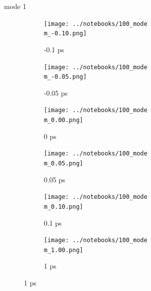 \documentclass{beamer}
\begin{document}
\renewcommand\m{1}
\begin{frame}{mode \m}
	\begin{figure}
		\centering
		\begin{subfigure}[b]{\w\textwidth}
			\centering
			\texttt{[image: ../notebooks/100\_mode\\m\_-0.10.png]}
			\caption{-0.1 ps}
		\end{subfigure}
		\begin{subfigure}[b]{\w\textwidth}
			\centering
			\texttt{[image: ../notebooks/100\_mode\\m\_-0.05.png]}
			\caption{-0.05 ps}
		\end{subfigure}
		\begin{subfigure}[b]{\w\textwidth}
			\centering
			\texttt{[image: ../notebooks/100\_mode\\m\_0.00.png]}
			\caption{0 ps}
		\end{subfigure}
		\begin{subfigure}[b]{\w\textwidth}
			\centering
			\texttt{[image: ../notebooks/100\_mode\\m\_0.05.png]}
			\caption{0.05 ps}
		\end{subfigure}
		\begin{subfigure}[b]{\w\textwidth}
			\centering
			\texttt{[image: ../notebooks/100\_mode\\m\_0.10.png]}
			\caption{0.1 ps}
		\end{subfigure}
		\begin{subfigure}[b]{\w\textwidth}
			\centering
			\texttt{[image: ../notebooks/100\_mode\\m\_1.00.png]}
			\caption{1 ps}
		\end{subfigure}
	\end{figure}
\end{frame}
\end{document}
